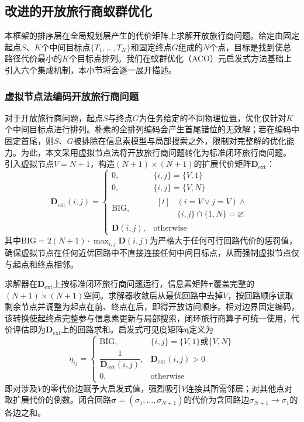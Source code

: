 \documentclass[lettersize,journal]{IEEEtran}
\begin{document}
\subsection{改进的开放旅行商蚁群优化}
\label{subsec:aco}
本框架的排序层在全局规划层产生的代价矩阵上求解开放旅行商问题。给定由固定起点$S$、$K$个中间目标点$\{T_1, \dots, T_K\}$和固定终点$G$组成的$N$个点，目标是找到使总路径代价最小的$K$个目标点排列。我们在蚁群优化（ACO）元启发式方法基础上引入六个集成机制，本小节将会逐一展开描述。
\subsubsection{虚拟节点法编码开放旅行商问题}
\label{subsec:virtual}
对于开放旅行商问题，起点$S$与终点$G$为任务给定的不同物理位置，优化仅针对$K$个中间目标点进行排列。朴素的全排列编码会产生首尾错位的无效解；若在编码中固定首尾，则$S$、$G$被排除在信息素模型与局部搜索之外，限制对完整解的优化能力。为此，本文采用虚拟节点法将开放旅行商问题转化为标准闭环旅行商问题\textcolor{blue}{\cite{ref32}}。
引入虚拟节点$V = N + 1$，构造$(N+1) \times (N+1)$的扩展代价矩阵$\mathbf{D}_{\mathrm{ext}}$：
\begin{equation}
\mathbf{D}_{\mathrm{ext}}(i, j) =
\begin{cases}
0, & \{i, j\} = \{V, 1\} \\
0, & \{i, j\} = \{V, N\} \\
\mathrm{BIG}, & \begin{aligned}[t]
& (i = V \lor j = V) \land \\
& \{i, j\} \cap \{1, N\} = \varnothing
\end{aligned} \\
\mathbf{D}(i, j), & \text{otherwise}
\end{cases}
\label{eq:dext}
\end{equation}
其中$\mathrm{BIG} = 2(N+1) \cdot \max_{i,j} \mathbf{D}(i,j)$为严格大于任何可行回路代价的惩罚值，确保虚拟节点在任何近优回路中不直接连接任何中间目标点，从而强制虚拟节点仅与起点和终点相邻。

求解器在$\mathbf{D}_{\mathrm{ext}}$上按标准闭环旅行商问题运行，信息素矩阵$\bm{\tau}$覆盖完整的$(N+1)\times(N+1)$空间。求解器收敛后从最优回路中去掉$V$，按回路顺序读取剩余节点并调整为起点在前、终点在后，即得开放访问顺序。相对边界固定编码，该转换使起终点完整参与信息素更新与局部搜索，闭环旅行商算子可统一使用，代价评估即为$\mathbf{D}_{\mathrm{ext}}$上的回路求和。启发式可见度矩阵$\bm{\eta}$定义为
\begin{equation}
\eta_{ij} =
\begin{cases}
\mathrm{BIG}, & \{i, j\} = \{V, 1\} \text{或} \{V, N\} \\
\dfrac{1}{\mathbf{D}_{\mathrm{ext}}(i,j)}, & \mathbf{D}_{\mathrm{ext}}(i,j) > 0 \\
0, & \text{otherwise}
\end{cases}
\label{eq:eta}
\end{equation}
即对涉及$V$的零代价边赋予大启发式值，强烈吸引$V$连接其所需邻居；对其他点对取扩展代价的倒数。闭合回路$\bm{\sigma} = (\sigma_1, \dots, \sigma_{N+1})$的代价为含回路边$\sigma_{N+1} \to \sigma_1$的各边之和。
\end{document}
